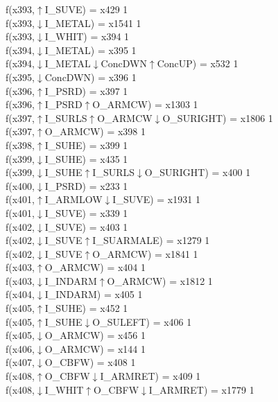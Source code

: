f(x393,$\uparrow$I\_SUVE) = x429 {1} \\
f(x393,$\downarrow$I\_METAL) = x1541 {1} \\
f(x393,$\downarrow$I\_WHIT) = x394 {1} \\
f(x394,$\downarrow$I\_METAL) = x395 {1} \\
f(x394,$\downarrow$I\_METAL$\downarrow$ConcDWN$\uparrow$ConcUP) = x532 {1} \\
f(x395,$\downarrow$ConcDWN) = x396 {1} \\
f(x396,$\uparrow$I\_PSRD) = x397 {1} \\
f(x396,$\uparrow$I\_PSRD$\uparrow$O\_ARMCW) = x1303 {1} \\
f(x397,$\uparrow$I\_SURLS$\uparrow$O\_ARMCW$\downarrow$O\_SURIGHT) = x1806 {1} \\
f(x397,$\uparrow$O\_ARMCW) = x398 {1} \\
f(x398,$\uparrow$I\_SUHE) = x399 {1} \\
f(x399,$\downarrow$I\_SUHE) = x435 {1} \\
f(x399,$\downarrow$I\_SUHE$\uparrow$I\_SURLS$\downarrow$O\_SURIGHT) = x400 {1} \\
f(x400,$\downarrow$I\_PSRD) = x233 {1} \\
f(x401,$\uparrow$I\_ARMLOW$\downarrow$I\_SUVE) = x1931 {1} \\
f(x401,$\downarrow$I\_SUVE) = x339 {1} \\
f(x402,$\downarrow$I\_SUVE) = x403 {1} \\
f(x402,$\downarrow$I\_SUVE$\uparrow$I\_SUARMALE) = x1279 {1} \\
f(x402,$\downarrow$I\_SUVE$\uparrow$O\_ARMCW) = x1841 {1} \\
f(x403,$\uparrow$O\_ARMCW) = x404 {1} \\
f(x403,$\downarrow$I\_INDARM$\uparrow$O\_ARMCW) = x1812 {1} \\
f(x404,$\downarrow$I\_INDARM) = x405 {1} \\
f(x405,$\uparrow$I\_SUHE) = x452 {1} \\
f(x405,$\uparrow$I\_SUHE$\downarrow$O\_SULEFT) = x406 {1} \\
f(x405,$\downarrow$O\_ARMCW) = x456 {1} \\
f(x406,$\downarrow$O\_ARMCW) = x144 {1} \\
f(x407,$\downarrow$O\_CBFW) = x408 {1} \\
f(x408,$\uparrow$O\_CBFW$\downarrow$I\_ARMRET) = x409 {1} \\
f(x408,$\downarrow$I\_WHIT$\uparrow$O\_CBFW$\downarrow$I\_ARMRET) = x1779 {1} \\
